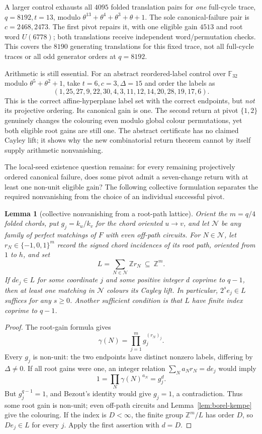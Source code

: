 \documentclass[11pt,a4paper]{article}
\newtheorem{lemma}[theorem]{Lemma}
\theoremstyle{definition}
\theoremstyle{remark}
\newcommand{\ZZ}{\mathbb{Z}}
\begin{document}
A larger control exhausts all $4095$ folded translation pairs for \emph{one} full-cycle trace, $q=8192,t=13$, modulo $\theta^{13}+\theta^4+\theta^3+\theta+1$.  The sole canonical-failure pair is $c=2468,2473$.  The first pivot repairs it, with one eligible gain $4513$ and root word $U(6778)$; both translations receive independent word/permutation checks.  This covers the $8190$ generating translations for this fixed trace, not all full-cycle traces or all odd generator orders at $q=8192$.

Arithmetic is still essential.  For an abstract reordered-label control over $\mathbb F_{32}$ modulo $\theta^5+\theta^2+1$, take $t=6,c=3,\Delta=15$ and order the labels as
\[
       (1,25,27,9,22,30,4,3,11,12,14,20,28,19,17,6).
\]
This is the correct affine-hyperplane label set with the correct endpoints, but \emph{not} its projective ordering.  Its canonical gain is one.  The second return at pivot $\{1,2\}$ genuinely changes the colouring even modulo global colour permutations, yet both eligible root gains are still one.  The abstract certificate has no claimed Cayley lift; it shows why the new combinatorial return theorem cannot by itself supply arithmetic nonvanishing.

The local-seed existence question remains: for every remaining projectively ordered canonical failure, does some pivot admit a seven-change return with at least one non-unit eligible gain?  The following collective formulation separates the required nonvanishing from the choice of an individual successful pivot.

\begin{lemma}[collective nonvanishing from a root-path lattice]\label{lem:borel-root-lattice}
Orient the $m=q/4$ folded chords, put $g_j=k_u/k_v$ for the chord oriented $u\to v$, and let $\mathcal N$ be any family of perfect matchings of $F$ with even off-path circuits.  For $N\in\mathcal N$, let $r_N\in\{-1,0,1\}^m$ record the signed chord incidences of its root path, oriented from $1$ to $h$, and set
\[
             L=\sum_{N\in\mathcal N}\ZZ r_N\ \subseteq\ \ZZ^m.
\]
If $d e_j\in L$ for some coordinate $j$ and some positive integer $d$ coprime to $q-1$, then at least one matching in $\mathcal N$ colours its Cayley lift.  In particular, $2^s e_j\in L$ suffices for any $s\ge0$.  Another sufficient condition is that $L$ have finite index coprime to $q-1$.
\end{lemma}
\begin{proof}
The root-gain formula gives
\[
              \gamma(N)=\prod_{j=1}^m g_j^{(r_N)_j}.
\]
Every $g_j$ is non-unit: the two endpoints have distinct nonzero labels, differing by $\Delta\ne0$.  If all root gains were one, an integer relation $\sum_N a_N r_N=d e_j$ would imply
\[
                   1=\prod_N\gamma(N)^{a_N}=g_j^d.
\]
But $g_j^{q-1}=1$, and Bezout's identity would give $g_j=1$, a contradiction.  Thus some root gain is non-unit; even off-path circuits and Lemma~\ref{lem:borel-kempe} give the colouring.  If the index is $D<\infty$, the finite group $\ZZ^m/L$ has order $D$, so $D e_j\in L$ for every $j$.  Apply the first assertion with $d=D$.
\end{proof}
\end{document}
